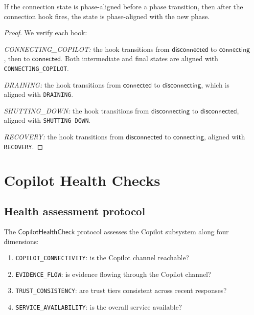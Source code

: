 \documentclass[11pt]{article}
\newcommand{\HealthChk}{\mathsf{CopilotHealthCheck}}
\begin{document}
\begin{lemma}\label{lem:hookalign}
If the connection state is phase-aligned before a phase
transition, then after the connection hook fires, the
state is phase-aligned with the new phase.
\end{lemma}
\begin{proof}
We verify each hook:

\emph{CONNECTING\_COPILOT:} the hook transitions from
$\mathsf{disconnected}$ to $\mathsf{connecting}$, then
to $\mathsf{connected}$.  Both intermediate and final
states are aligned with \texttt{CONNECTING\_COPILOT}.

\emph{DRAINING:} the hook transitions from
$\mathsf{connected}$ to $\mathsf{disconnecting}$, which
is aligned with \texttt{DRAINING}.

\emph{SHUTTING\_DOWN:} the hook transitions from
$\mathsf{disconnecting}$ to $\mathsf{disconnected}$,
aligned with \texttt{SHUTTING\_DOWN}.

\emph{RECOVERY:} the hook transitions from
$\mathsf{disconnected}$ to $\mathsf{connecting}$,
aligned with \texttt{RECOVERY}.
\end{proof}

\section{Copilot Health Checks}\label{sec:health}

\subsection{Health assessment protocol}

The $\HealthChk$ protocol assesses the Copilot subsystem
along four dimensions:
\begin{enumerate}
\item \texttt{COPILOT\_CONNECTIVITY}: is the Copilot channel
      reachable?
\item \texttt{EVIDENCE\_FLOW}: is evidence flowing through
      the Copilot channel?
\item \texttt{TRUST\_CONSISTENCY}: are trust tiers consistent
      across recent responses?
\item \texttt{SERVICE\_AVAILABILITY}: is the overall service
      available?
\end{enumerate}
\end{document}
